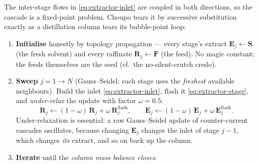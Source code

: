 \documentclass[11pt,a4paper]{article}
\begin{document}
The inter-stage flows in \eqref{eq:extractor-inlet} are coupled in both
directions, so the cascade is a fixed-point problem. Choupo tears it by
successive substitution exactly as a distillation column tears its
bubble-point loop:
\begin{enumerate}[leftmargin=*]
  \item \textbf{Initialise} honestly by topology propagation --- every
        stage's extract $\mathbf{E}_j \leftarrow \mathbf{S}$ (the fresh
        solvent) and every raffinate $\mathbf{R}_j \leftarrow \mathbf{F}$
        (the feed). No magic constant; the feeds themselves are the seed
        (cf.\ the no-silent-crutch credo).
  \item \textbf{Sweep} $j = 1 \to N$ (Gauss--Seidel: each stage uses the
        \emph{freshest} available neighbours). Build the inlet
        \eqref{eq:extractor-inlet}, flash it \eqref{eq:extractor-stage},
        and \emph{under-relax} the update with factor $\omega = 0.5$:
        \begin{equation}
           \mathbf{R}_j \leftarrow (1-\omega)\,\mathbf{R}_j
                               + \omega\,\mathbf{R}_j^{\text{flash}},
           \qquad
           \mathbf{E}_j \leftarrow (1-\omega)\,\mathbf{E}_j
                               + \omega\,\mathbf{E}_j^{\text{flash}} .
        \end{equation}
        Under-relaxation is essential: a raw Gauss--Seidel update of
        counter-current cascades oscillates, because changing
        $\mathbf{E}_j$ changes the inlet of stage $j-1$, which changes
        \emph{its} extract, and so on back up the column.
  \item \textbf{Iterate} until the \emph{column mass balance closes}.
\end{enumerate}
\end{document}
